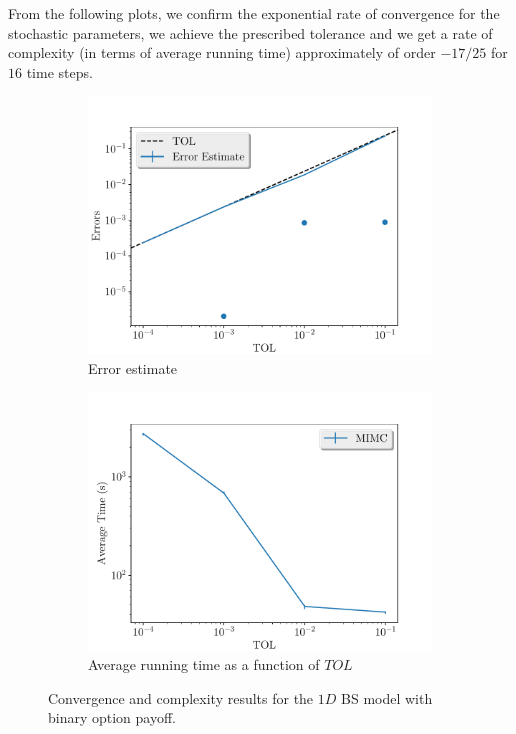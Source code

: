 \documentclass[11pt]{article}
\begin{document}
From the following plots, we confirm the exponential rate of convergence for the stochastic parameters, we achieve the prescribed tolerance and  we get a rate of complexity (in terms of average running time) approximately of order $-17/25$ for $16$ time steps.
\begin{figure}[!h]
	\centering
	\begin{subfigure}{.5\textwidth}
		\centering
		\includegraphics[width=1\linewidth]{./figures/binary_16_steps/error_estimate.pdf}
		\caption{Error estimate}
		\label{fig:misc_binary_16_steps_sub1}
	\end{subfigure}%
	\begin{subfigure}{.5\textwidth}
		\centering
		\includegraphics[width=1\linewidth]{./figures/binary_16_steps/average_running_time.pdf}
		\caption{Average running time as a function of $TOL$}
		\label{fig:misc_binary_16_steps_sub2}
	\end{subfigure}%
	\caption{Convergence and complexity results for the $1D$ BS model with binary option payoff.}
	\label{fig:misc_binary_16_steps_1}
\end{figure}
\end{document}
